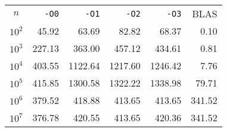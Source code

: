 \begin{center}
  \bgroup{}
  \begin{tabular}{c|rrrr|r}
    \hline
    $n$ & \texttt{-O0} & \texttt{-O1} & \texttt{-O2} & \texttt{-O3} & BLAS \\
    \hhline{======}
    $10^2$ & 45.92 & 63.69 & 82.82 & 68.37 & 0.10 \\
    $10^3$ & 227.13 & 363.00 & 457.12 & 434.61 & 0.81 \\
    $10^4$ & 403.55 & 1122.64 & 1217.60 & 1246.42 & 7.76 \\
    $10^5$ & 415.85 & 1300.58 & 1322.22 & 1338.98 & 79.71 \\
    $10^6$ & 379.52 & 418.88 & 413.65 & 413.65 & 341.52 \\
    $10^7$ & 376.78 & 420.55 & 413.65 & 420.36 & 341.52 \\
    \hline
  \end{tabular}
  \egroup
\end{center}
